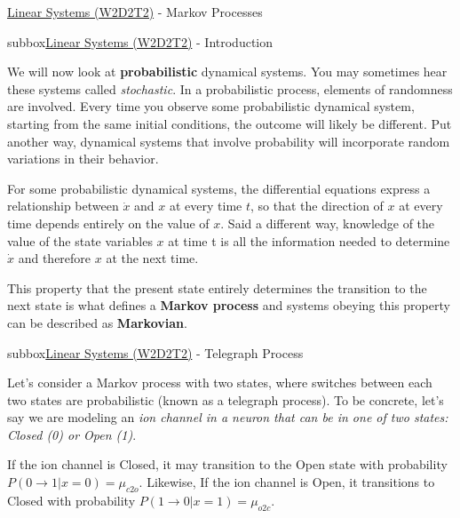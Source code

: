\begin{textbox}{\href{https://colab.research.google.com/github/NeuromatchAcademy/course-content/blob/master/tutorials/W2D2_LinearSystems/student/W2D2_Tutorial2.ipynb}{Linear Systems (W2D2T2)} -  Markov Processes}
\begin{subbox}{subbox}{\href{https://colab.research.google.com/github/NeuromatchAcademy/course-content/blob/master/tutorials/W2D2_LinearSystems/student/W2D2_Tutorial2.ipynb}{Linear Systems (W2D2T2)}  -  Introduction }

\scriptsize

We will now look at \textbf{probabilistic} dynamical systems. You may sometimes hear these systems called \textit{stochastic}. In a probabilistic process, elements of randomness are involved. Every time you observe some probabilistic dynamical system, starting from the same initial conditions, the outcome will likely be different. Put another way, dynamical systems that involve probability will incorporate random variations in their behavior. 

For some probabilistic dynamical systems, the differential equations express a relationship between $\dot{x}$ and $x$ at every time $t$, so that the direction of $x$ at every time depends entirely on the value of $x$. Said a different way, knowledge of the value of the state variables $x$ at time t is all the information needed to determine $\dot{x}$ and therefore $x$ at the next time.

This property that the present state entirely determines the transition to the next state  is what defines a \textbf{Markov process} and systems obeying this property can be described as \textbf{Markovian}.


\end{subbox}
\begin{subbox}{subbox}{\href{https://colab.research.google.com/github/NeuromatchAcademy/course-content/blob/master/tutorials/W2D2_LinearSystems/student/W2D2_Tutorial2.ipynb}{Linear Systems (W2D2T2)}  -  Telegraph Process}

\scriptsize

Let's consider a Markov process with two states, where switches between each two states are probabilistic (known as a telegraph process). To be concrete, let's say we are modeling an \textit{ion channel in a neuron that can be in one of two states: Closed (0) or Open (1)}. 

If the ion channel is Closed, it may transition to the Open state with probability $P(0 \rightarrow 1 | x = 0) = \mu_{c2o}$. Likewise, If the ion channel is Open, it transitions to Closed with probability $P(1 \rightarrow 0 | x=1) = \mu_{o2c}$.


\end{subbox}
\end{textbox}
